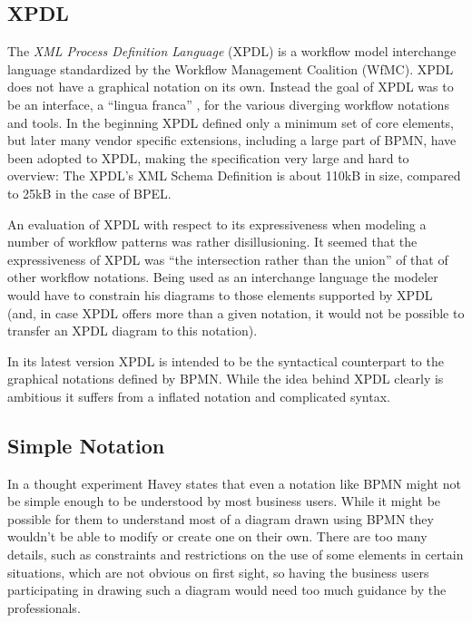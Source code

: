 \subsection{XPDL}

The \emph{XML Process Definition Language} (XPDL) \cite{spec_xpdl} is a workflow model interchange language standardized by the Workflow Management Coalition (WfMC). XPDL does not have a graphical notation on its own. Instead the goal of XPDL was to be an interface, a ``lingua franca'' \cite{ce-xpdl}, for the various diverging workflow notations and tools. In the beginning XPDL defined only a minimum set of core elements, but later many vendor specific extensions, including a large part of BPMN, have been adopted to XPDL, making the specification very large and hard to overview: The XPDL's XML Schema Definition is about 110kB in size, compared to 25kB in the case of BPEL.

An evaluation of XPDL with respect to its expressiveness when modeling a number of workflow patterns \cite{ce-xpdl} was rather disillusioning. It seemed that the expressiveness of XPDL was ``the intersection rather than the union'' of that of other workflow notations. Being used as an interchange language the modeler would have to constrain his diagrams to those elements supported by XPDL (and, in case XPDL offers more than a given notation, it would not be possible to transfer an XPDL diagram to this notation).

In its latest version XPDL is intended to be the syntactical counterpart to the graphical notations defined by BPMN. While the idea behind XPDL clearly is ambitious it suffers from a inflated notation and complicated syntax.


\subsection{Simple Notation}
In a thought experiment Havey \cite{havey} states that even a notation like BPMN might not be simple enough to be understood by most business users. While it might be possible for them to understand most of a diagram drawn using BPMN they wouldn't be able to modify or create one on their own. There are too many details, such as constraints and restrictions on the use of some elements in certain situations, which are not obvious on first sight, so having the business users participating in drawing such a diagram would need too much guidance by the professionals.

